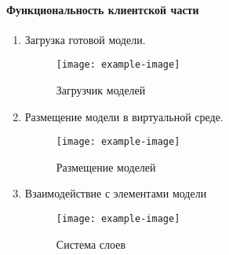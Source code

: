 \paragraph{Функциональность клиентской части}


\begin{enumerate}
    \item {
        Загрузка готовой модели.

        \begin{figure}[h]
            \centering
            \texttt{[image: example-image]}
            \caption{Загрузчик моделей}
            \label{figure:ClModelLoader}
        \end{figure}
    } 
    \item {
        Размещение модели в виртуальной среде.

        \begin{figure}[h]
            \centering
            \texttt{[image: example-image]}
            \caption{Размещение моделей}
            \label{figure:ClStand}
        \end{figure}
    } 
    \item {
        Взаимодействие с элементами модели

        \begin{figure}[h]
            \centering
            \texttt{[image: example-image]}
            \caption{Система слоев}
            \label{figure:ClLayers}
        \end{figure}
    } 
\end{enumerate}

